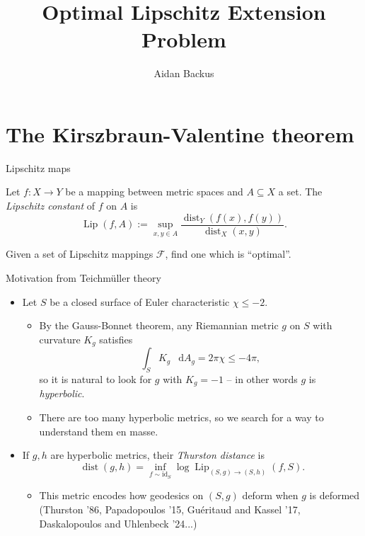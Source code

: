 \documentclass[10pt]{beamer}
\title{Optimal Lipschitz Extension Problem}
\author{Aidan Backus}
\newcommand*\dif{\mathop{}\!\mathrm{d}}
\DeclareMathOperator{\dist}{dist}
\DeclareMathOperator{\Lip}{Lip}
\newcommand{\id}{\mathrm{id}}
\begin{document}
\frame{\titlepage}

\section{The Kirszbraun-Valentine theorem}

\begin{frame}{Lipschitz maps}
\begin{definition}
Let $f: X \to Y$ be a mapping between metric spaces and $A \subseteq X$ a set.
The \emph{Lipschitz constant} of $f$ on $A$ is
$$\Lip(f, A) := \sup_{x, y \in A} \frac{\dist_Y(f(x), f(y))}{\dist_X(x, y)}.$$
\end{definition}
 
\begin{problem}
Given a set of Lipschitz mappings $\mathscr F$, find one which is ``optimal''.
\end{problem}
\end{frame}

\begin{frame}{Motivation from Teichm\"uller theory}
\begin{itemize}
\item Let $S$ be a closed surface of Euler characteristic $\chi \leq -2$. 
\begin{itemize}
\item By the Gauss-Bonnet theorem, any Riemannian metric $g$ on $S$ with curvature $K_g$ satisfies 
$$\int_S K_g ~\dif A_g = 2\pi \chi \leq -4\pi,$$
so it is natural to look for $g$ with $K_g = -1$ -- in other words $g$ is \emph{hyperbolic}.
\item There are too many hyperbolic metrics, so we search for a way to understand them en masse. 
\end{itemize}
\item If $g, h$ are hyperbolic metrics, their \emph{Thurston distance} is
$$\dist(g, h) = \inf_{f \sim \id_S} \log \Lip_{(S, g) \to (S, h)}(f, S).$$
\begin{itemize}
\item This metric encodes how geodesics on $(S, g)$ deform when $g$ is deformed (Thurston '86, Papadopoulos '15, Gu\'eritaud and Kassel '17, Daskalopoulos and Uhlenbeck '24...) 
\end{itemize}
\end{itemize}
\end{frame}
\end{document}
